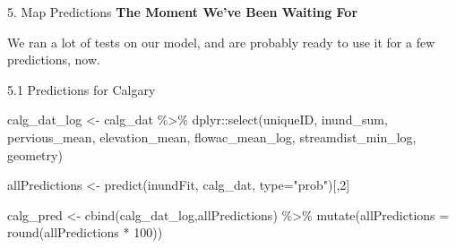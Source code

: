 \documentclass[
  ignorenonframetext,
]{beamer}
\newenvironment{Shaded}{\begin{snugshade}}{\end{snugshade}}
\newcommand{\AttributeTok}[1]{\textcolor[rgb]{0.77,0.63,0.00}{#1}}
\newcommand{\DecValTok}[1]{\textcolor[rgb]{0.00,0.00,0.81}{#1}}
\newcommand{\FunctionTok}[1]{\textcolor[rgb]{0.00,0.00,0.00}{#1}}
\newcommand{\NormalTok}[1]{#1}
\newcommand{\OtherTok}[1]{\textcolor[rgb]{0.56,0.35,0.01}{#1}}
\newcommand{\SpecialCharTok}[1]{\textcolor[rgb]{0.00,0.00,0.00}{#1}}
\newcommand{\StringTok}[1]{\textcolor[rgb]{0.31,0.60,0.02}{#1}}
\begin{document}
\begin{frame}[fragile]{5. Map Predictions}
\protect\hypertarget{map-predictions}{}
\textbf{The Moment We've Been Waiting For}

We ran a lot of tests on our model, and are probably ready to use it for
a few predictions, now.

\begin{block}{5.1 Predictions for Calgary}
\protect\hypertarget{predictions-for-calgary}{}
\begin{Shaded}
\begin{Highlighting}[]
\NormalTok{calg\_dat\_log }\OtherTok{\textless{}{-}}\NormalTok{ calg\_dat }\SpecialCharTok{\%\textgreater{}\%} 
\NormalTok{  dplyr}\SpecialCharTok{::}\FunctionTok{select}\NormalTok{(uniqueID, inund\_sum, pervious\_mean, elevation\_mean, flowac\_mean\_log, streamdist\_min\_log, geometry)}


\NormalTok{allPredictions }\OtherTok{\textless{}{-}} 
  \FunctionTok{predict}\NormalTok{(inundFit, calg\_dat, }\AttributeTok{type=}\StringTok{"prob"}\NormalTok{)[,}\DecValTok{2}\NormalTok{]}
  
\NormalTok{calg\_pred }\OtherTok{\textless{}{-}} 
  \FunctionTok{cbind}\NormalTok{(calg\_dat\_log,allPredictions) }\SpecialCharTok{\%\textgreater{}\%}
  \FunctionTok{mutate}\NormalTok{(}\AttributeTok{allPredictions =} \FunctionTok{round}\NormalTok{(allPredictions }\SpecialCharTok{*} \DecValTok{100}\NormalTok{)) }
\end{Highlighting}
\end{Shaded}


\end{block}
\end{frame}
\end{document}
